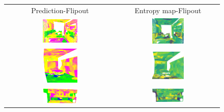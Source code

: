     \begin{figure}[h!]
        \centering
        \begin{tabular}{cc}
            Prediction-Flipout & Entropy map-Flipout \\
            \includegraphics[width=0.33\textwidth, height=0.18\textheight]{images/seg_output/s3dis_DE/office_3.pdf}& 
            \includegraphics[width=0.33\textwidth, height=0.18\textheight]{images/seg_output/flipout/ent_fout_s3dis_3.pdf}\\

            \includegraphics[width=0.33\textwidth, height=0.18\textheight]{images/seg_output/s3dis_DE/ocroom_1.pdf}& 
            \includegraphics[width=0.33\textwidth, height=0.18\textheight]{images/seg_output/flipout/ent_fout_s3dis_1.pdf}\\

            \includegraphics[width=0.33\textwidth, height=0.18\textheight]{images/seg_output/s3dis_DE/opantry_1.pdf}& 
            \includegraphics[width=0.33\textwidth, height=0.18\textheight]{images/seg_output/flipout/ent_fout_s3dis_2.pdf}\\


\end{tabular}
\end{figure}
